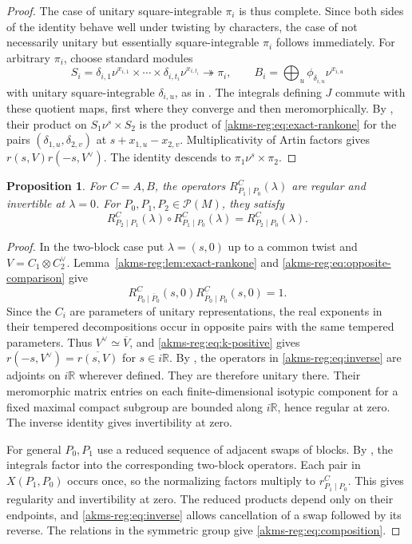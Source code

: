 \documentclass[11pt,reqno]{amsart}
\theoremstyle{plain}
\newtheorem{prop}[thm]{Proposition}
\theoremstyle{definition}
\newcommand{\R}{\mathbb{R}}
\numberwithin{equation}{subsection}
\begin{document}
\begin{proof}
The case of unitary square-integrable $\pi_i$ is thus complete. Since both sides of the identity behave well under twisting by characters, the case of not necessarily unitary but essentially square-integrable $\pi_i$ follows immediately. For arbitrary $\pi_i$, choose standard modules
\[
 S_i=\delta_{i,1}\nu^{x_{i,1}}\times\cdots\times
     \delta_{i,t_i}\nu^{x_{i,t_i}}\twoheadrightarrow\pi_i,
 \qquad
 B_i=\bigoplus_u\phi_{\delta_{i,u}}\nu^{x_{i,u}}
\]
with unitary square-integrable $\delta_{i,u}$, as in
\cite[Thm.~3.3]{BadRen}.
The integrals defining $J$ commute with these quotient maps,
first where they converge and then meromorphically.
By \cite[\S1 (J2)--(J3)]{ArtIOR1}, their product on
$S_1\nu^s\times S_2$ is the product of
\eqref{akms-reg:eq:exact-rankone} for the pairs
$(\delta_{1,u},\delta_{2,v})$ at $s+x_{1,u}-x_{2,v}$.
Multiplicativity of Artin factors gives
$r(s,V)r(-s,V^\vee)$. The identity descends to
$\pi_1\nu^s\times\pi_2$.
\end{proof}


\begin{prop}\label{akms-reg:prop:composition}
For $C=A,B$, the operators
$R^C_{P_1\mid P_0}(\lambda)$ are regular and invertible
at $\lambda=0$. For $P_0,P_1,P_2\in\mathcal P(M)$, they satisfy
\begin{equation}\label{akms-reg:eq:composition}
 R^C_{P_2\mid P_1}(\lambda)\circ 
 R^C_{P_1\mid P_0}(\lambda)
 =R^C_{P_2\mid P_0}(\lambda).
\end{equation}
\end{prop}
\begin{proof}
In the two-block case put $\lambda=(s,0)$ up to a common twist and
$V=C_1\otimes C_2^\vee$. Lemma~\ref{akms-reg:lem:exact-rankone} and
\eqref{akms-reg:eq:opposite-comparison} give
\begin{equation}\label{akms-reg:eq:inverse}
 R^C_{P_0\mid\overline P_0}(s,0)
 R^C_{\overline P_0\mid P_0}(s,0)=1.
\end{equation}
Since the $C_i$ are parameters of unitary representations, the real
exponents in their tempered decompositions occur in opposite pairs
with the same tempered parameters. Thus $V^\vee\simeq\overline V$,
and \eqref{akms-reg:eq:k-positive} gives
$r(-s,V^\vee)=\overline{r(s,V)}$ for $s\in i\R$. By
\cite[\S1 (J4)]{ArtIOR1}, the operators in
\eqref{akms-reg:eq:inverse} are adjoints on $i\R$ wherever defined.
They are therefore unitary there. Their meromorphic matrix entries
on each finite-dimensional isotypic component for a fixed maximal
compact subgroup are bounded along $i\R$, hence regular at zero. The inverse
identity gives invertibility at zero.

For general $P_0,P_1$ use a reduced sequence of adjacent swaps of
blocks. By \cite[\S1 (J2)--(J3)]{ArtIOR1}, the integrals factor into
the corresponding two-block operators. Each pair in $X(P_1,P_0)$
occurs once, so the normalizing factors multiply to
$r^C_{P_1\mid P_0}$. This gives regularity and invertibility at zero.
The reduced products depend only on their endpoints, and
\eqref{akms-reg:eq:inverse} allows cancellation of a swap followed
by its reverse. The relations in the symmetric group give
\eqref{akms-reg:eq:composition}.
\end{proof}
\end{document}
